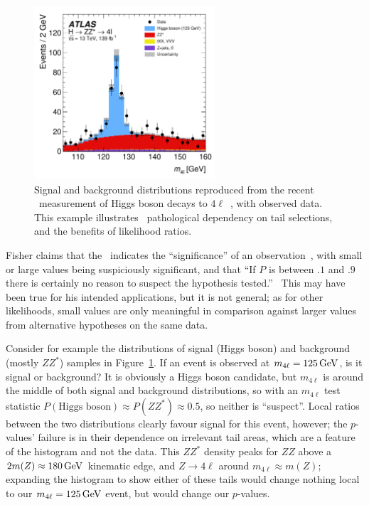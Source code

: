 \begin{figure}[tp]
\centering
\includegraphics[width=0.6\textwidth]{figures/searches_atlas_higgs_4l_2207_00320.pdf}
\caption[
Signal and background distributions reproduced from the recent \atlas\
measurement of Higgs boson decays to $4\ell$
]{%
Signal and background distributions reproduced from the recent \atlas\
measurement of Higgs boson decays to $4\ell$~\cite{ATLAS:2022net}, with
observed data.
This example illustrates \pvalues\ pathological dependency on tail selections,
and the benefits of likelihood ratios.
}
\label{fig:searches_atlas_higgs_4l}
\end{figure}

Fisher claims that the \pvalue\ indicates the ``significance'' of an
observation~\cite{fisher1925smrw}, with small or large values being
suspiciously significant, and that
``If $P$ is between $.1$ and $.9$ there is certainly no reason to suspect the
hypothesis tested.''~\cite{fisher1925smrw}
This may have been true for his intended applications, but it is not general;
as for other likelihoods, small values are only meaningful in comparison
against larger values from alternative hypotheses on the same data.

Consider for example the distributions of signal (Higgs boson) and background
(mostly $ZZ^*$) samples in Figure~\ref{fig:searches_atlas_higgs_4l}.
If an event is observed at $m_{4\ell} = 125\,\eV[G]$, is it signal or
background?
It is obviously a Higgs boson candidate, but $m_{4\ell}$ is around the middle
of both signal and background distributions, so with an $m_{4\ell}$ test
statistic $P(\textrm{Higgs boson}) \approx P(ZZ^*) \approx 0.5$, so neither
is ``suspect''.
Local ratios between the two distributions clearly favour signal for this
event, however; the $p$-values' failure is in their dependence on irrelevant
tail areas, which are a feature of the histogram and not the data.
This $ZZ^*$ density peaks for $ZZ$ above a
$2 m(Z) \approx 180\,\eV[G]$ kinematic edge,
and $Z \to 4\ell$ around $m_{4\ell} \approx m(Z)$;
expanding the histogram to show either of these tails would change nothing
local to our $m_{4\ell} = 125\,\eV[G]$ event, but would change our $p$-values.

